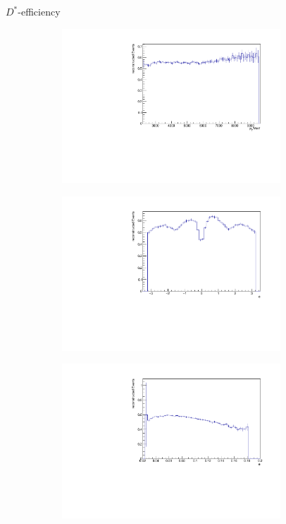 \documentclass[11pt]{beamer}
\begin{document}
\begin{frame}{$D^*$-efficiency}
\begin{figure}
\begin{subfigure}{0.45\textwidth}
\includegraphics[width=0.9\textwidth]{up_pdf/pos/h_pt_reco_Dst_pos.pdf}
\end{subfigure}
\begin{subfigure}{0.45\textwidth}
\includegraphics[width=0.9\textwidth]{up_pdf/pos/h_phi_reco_Dst_pos.pdf}
\end{subfigure}
\begin{subfigure}{0.45\textwidth}
\includegraphics[width=0.9\textwidth]{up_pdf/pos/h_theta_reco_Dst_pos.pdf}

\end{subfigure}
\end{figure}
\end{frame}
\end{document}
